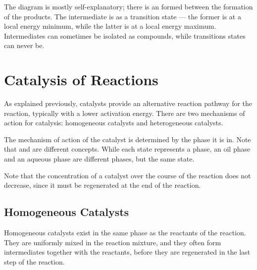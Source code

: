 				The diagram is mostly self-explanatory; there is an  formed between the formation of the products.
				The intermediate is  as a transition state --- the former is at a local energy minimum, while the latter
				is at a local energy maximum. Intermediates can sometimes be isolated as compounds, while transitions states can never be.






	\pagebreak
	\section{Catalysis of Reactions}

		As explained previously, catalysts provide an alternative reaction pathway for the reaction, typically with a lower activation energy.
		There are two mechanisms of action for catalysis: homogeneous catalysts and heterogeneous catalysts.

		The mechanism of action of the catalyst is determined by the phase it is in. Note that  and  are
		different concepts. While each state represents a phase, an oil phase and an aqueous phase are different phases, but the same state.

		Note that the concentration of a catalyst over the course of the reaction does not decrease, since it must be regenerated at the end of
		the reaction.


		\subsection{Homogeneous Catalysts}

			Homogeneous catalysts exist in the same phase as the reactants of the reaction. They are uniformly mixed in the reaction mixture,
			and they often form intermediates together with the reactants, before they are regenerated in the last step of the reaction.


